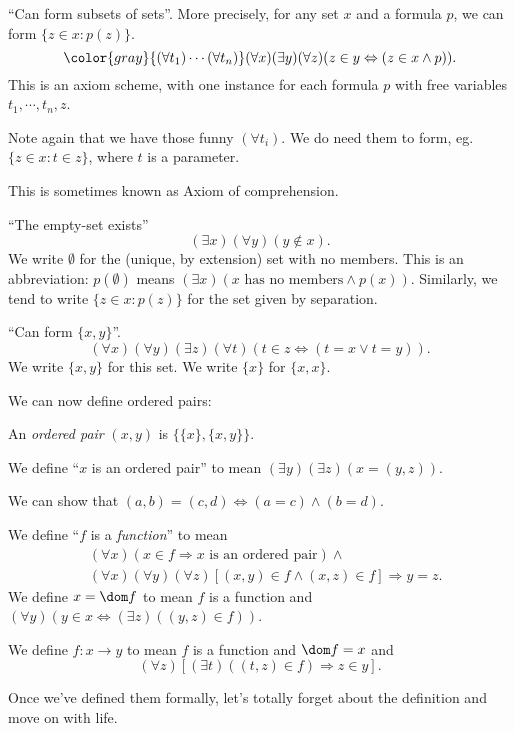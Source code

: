 \documentclass[a4paper]{article}
\begin{document}
\begin{axiom}
  ``Can form subsets of sets''. More precisely, for any set $x$ and a formula $p$, we can form $\{z\in x: p(z)\}$.
  \[
    {\color{gray}{(\forall t_1)\cdots(\forall t_n)}}(\forall x)(\exists y)(\forall z)(z\in y \Leftrightarrow (z\in x\wedge p)).
  \]
  This is an axiom scheme, with one instance for each formula $p$ with free variables $t_1, \cdots, t_n, z$.

  Note again that we have those funny $(\forall t_i)$. We do need them to form, eg. $\{z\in x: t\in z\}$, where $t$ is a parameter.

  This is sometimes known as Axiom of comprehension.
\end{axiom}
\begin{axiom}
  ``The empty-set exists''
  \[
    (\exists x)(\forall y)(y\not\in x).
  \]
  We write $\emptyset$ for the (unique, by extension) set with no members. This is an abbreviation: $p(\emptyset)$ means $(\exists x)(x\text{ has no members}\wedge p(x))$. Similarly, we tend to write $\{z\in x: p(z)\}$ for the set given by separation.
\end{axiom}
\begin{axiom}
  ``Can form $\{x, y\}$''.
  \[
    (\forall x)(\forall y)(\exists z)(\forall t)(t\in z \Leftrightarrow (t= x\vee t = y)).
  \]
  We write $\{x, y\}$ for this set. We write $\{x\}$ for $\{x, x\}$.
\end{axiom}

We can now define ordered pairs:
\begin{defi}
  An \emph{ordered pair} $(x, y)$ is $\{\{x\}, \{x, y\}\}$.

  We define ``$x$ is an ordered pair'' to mean $(\exists y)(\exists z)(x = (y, z))$.
\end{defi}
We can show that $(a, b) = (c, d) \Leftrightarrow (a = c) \wedge (b = d)$.

\begin{defi}[Function]
  We define ``$f$ is a \emph{function}'' to mean
  \begin{align*}
    & (\forall x)(x\in f\Rightarrow x\text{ is an ordered pair})\wedge\\
    & (\forall x)(\forall y)(\forall z)[(x, y)\in f \wedge (x, z)\in f]\Rightarrow y = z.
  \end{align*}
  We define $x = \dom f$ to mean $f$ is a function and $(\forall y)(y\in x \Leftrightarrow (\exists z)((y, z)\in f))$.

  We define $f: x\to y$ to mean $f$ is a function and $\dom f = x$ and
  \[
    (\forall z)[(\exists t)((t, z)\in f)\Rightarrow z\in y].
  \]
\end{defi}
Once we've defined them formally, let's totally forget about the definition and move on with life.
\end{document}
